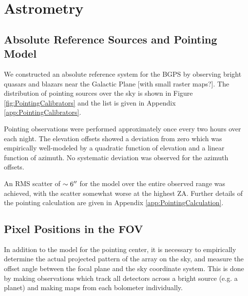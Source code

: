 \documentclass{emulateapj}
\begin{document}
\section{Astrometry}
\label{sec:Astrometry}

\subsection{Absolute Reference Sources and Pointing Model}

We constructed an absolute reference system for the BGPS by observing
bright quasars and blazars near the Galactic Plane [with small raster
maps?].  The distribution of pointing sources over the sky is shown in
Figure \ref{fig:PointingCalibrators} and the list is given in Appendix
\ref{app:PointingCalibrators}.

Pointing observations were performed approximately once every two
hours over each night.  The elevation offsets showed a deviation from
zero which was empirically well-modeled by a quadratic function of
elevation and a linear function of azimuth.  No systematic deviation
was observed for the azimuth offsets.

An RMS scatter of $\sim 6\mbox{$^{\prime\prime}$}$ for the model over the
entire observed range was achieved, with the scatter somewhat worse at the
highest ZA.  
Further details of the pointing calculation are given in Appendix
\ref{app:PointingCalculation}.

\subsection{Pixel Positions in the FOV}

In addition to the model for the pointing center, it is necessary to
empirically determine the actual projected pattern of the array on the
sky, and measure the offset angle between the focal plane and the sky
coordinate system.  This is done by making observations which track
all detectors across a bright source (e.g. a planet) and making maps
from each bolometer individually.

%
\end{document}
